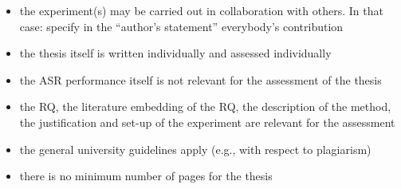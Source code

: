 \documentclass{article}
\theoremstyle{definition}
\theoremstyle{remark}
\begin{document}
\begin{itemize}
	\item the experiment(s) may be carried out in collaboration with others. In that case: specify in the “author’s statement” everybody’s contribution
	\item the thesis itself is written individually and assessed individually
	\item the ASR performance itself is not relevant for the assessment of the thesis
	\item the RQ, the literature embedding of the RQ, the description of the method, the justification and set-up of the experiment are relevant for the assessment 
	\item the general university guidelines apply (e.g., with respect to plagiarism)
	\item there is no minimum number of pages for the thesis
\end{itemize}





\newpage




\end{document}
